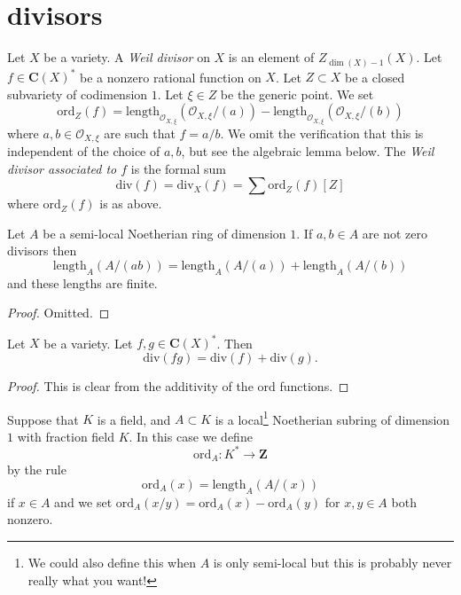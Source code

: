 \section{divisors}
\label{section-divisors}

\noindent
Let $X$ be a variety. A {\it Weil divisor} on $X$ is an element of
$Z_{\dim(X) - 1}(X)$. 
Let $f \in \mathbf{C}(X)^*$ be a nonzero rational
function on $X$. Let $Z \subset X$ be a closed subvariety of codimension $1$.
Let $\xi \in Z$ be the generic point. We set
$$
\text{ord}_Z(f)
=
\text{length}_{\mathcal{O}_{X, \xi}}(\mathcal{O}_{X, \xi}/(a))
-
\text{length}_{\mathcal{O}_{X, \xi}}(\mathcal{O}_{X, \xi}/(b))
$$
where $a, b \in \mathcal{O}_{X, \xi}$ are such that $f = a/b$.
We omit the verification that this is independent of the choice of
$a, b$, but see the algebraic lemma below.
The {\it Weil divisor associated to $f$} is the
formal sum
$$
\text{div}(f) = \text{div}_X(f) = \sum \text{ord}_Z(f) [Z]
$$
where $\text{ord}_Z(f)$ is as above.

\begin{lemma}
\label{lemma-length-additive}
Let $A$ be a semi-local Noetherian ring of dimension $1$.
If $a, b \in A$ are not zero divisors then
$$
\text{length}_A(A/(ab)) =
\text{length}_A(A/(a)) +
\text{length}_A(A/(b))
$$
and these lengths are finite.
\end{lemma}

\begin{proof}
Omitted.
\end{proof}

\begin{lemma}
\label{lemma-div-additive}
Let $X$ be a variety. Let $f, g \in \mathbf{C}(X)^*$.
Then
$$
\text{div}(fg) = \text{div}(f) + \text{div}(g).
$$
\end{lemma}

\begin{proof}
This is clear from the additivity of the $\text{ord}$ functions.
\end{proof}

\begin{definition}
\label{definition-ord}
Suppose that $K$ is a field, and $A \subset K$ is a
local\footnote{We could also define this when $A$ is only
semi-local but this is probably never really what you want!}
Noetherian subring of dimension $1$ with fraction field $K$.
In this case we define
$$
\text{ord}_A : K^* \longrightarrow \mathbf{Z}
$$
by the rule
$$
\text{ord}_A(x) = \text{length}_A(A/(x))
$$
if $x \in A$ and we set $\text{ord}_A(x/y) = \text{ord}_A(x) - \text{ord}_A(y)$
for $x, y \in A$ both nonzero.
\end{definition}

